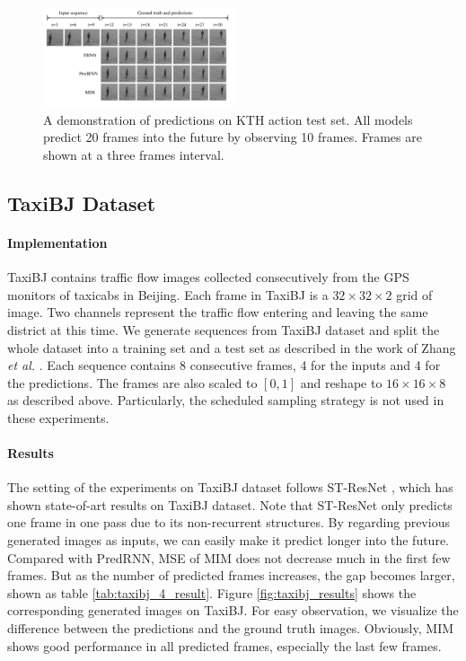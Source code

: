 \documentclass[10pt,twocolumn,letterpaper]{article}
\begin{document}
\begin{figure}[h]{}
  \centering
  \includegraphics[width=0.5\textwidth]{fig/action_predictions.pdf}
  \caption{A demonstration of predictions on KTH action test set. All models predict 20 frames into the future by observing 10 frames. Frames are shown at a three frames interval.}
  \label{fig:action_results}
\end{figure}


\subsection{TaxiBJ Dataset}

\paragraph{Implementation} TaxiBJ contains traffic flow images collected consecutively from the GPS monitors of taxicabs in Beijing. Each frame in TaxiBJ is a $32 \times 32 \times 2$ grid of image. Two channels represent the traffic flow entering and leaving the same district at this time. We generate sequences from TaxiBJ dataset and split the whole dataset into a training set and a test set as described in the work of Zhang \textit{et al.} \citep{zhang2016dnn}. Each sequence contains 8 consecutive frames, 4 for the inputs and 4 for the predictions. The frames are also scaled to $[0, 1]$ and reshape to $16 \times 16 \times 8$ as described above. Particularly, the scheduled sampling strategy \citep{bengio2015scheduled} is not used in these experiments.

\paragraph{Results} The setting of the experiments on TaxiBJ dataset follows ST-ResNet \citep{zhang2017deep}, which has shown state-of-art results on TaxiBJ dataset. Note that ST-ResNet only predicts one frame in one pass due to its non-recurrent structures. By regarding previous generated images as inputs, we can easily make it predict longer into the future. Compared with PredRNN, MSE of MIM does not decrease much in the first few frames. But as the number of predicted frames increases, the gap becomes larger, shown as table \ref{tab:taxibj_4_result}. Figure \ref{fig:taxibj_results} shows the corresponding generated images on TaxiBJ. For easy observation, we visualize the difference between the predictions and the ground truth images. Obviously, MIM shows good performance in all predicted frames, especially the last few frames.
\end{document}
